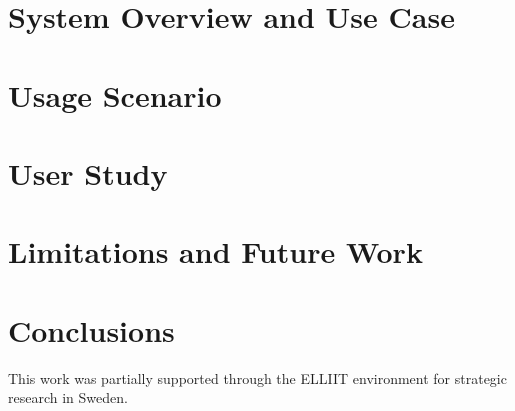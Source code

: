\documentclass[Afour,sagev,times]{sagej}
\newcommand\BibTeX{{\rmfamily B\kern-.05em \textsc{i\kern-.025em b}\kern-.08em
T\kern-.1667em\lower.7ex\hbox{E}\kern-.125emX}}
\begin{document}
\section{System Overview and Use Case} \label{sec:overview}
  

\section{Usage Scenario} \label{sec:case}
  

\section{User Study} \label{sec:eval}
  

\section{Limitations and Future Work} \label{sec:lim}
  

\section{Conclusions} \label{sec:con}%
  

\begin{acks}
This work was partially supported through the ELLIIT environment for strategic research in Sweden.
\end{acks}

%


\end{document}
